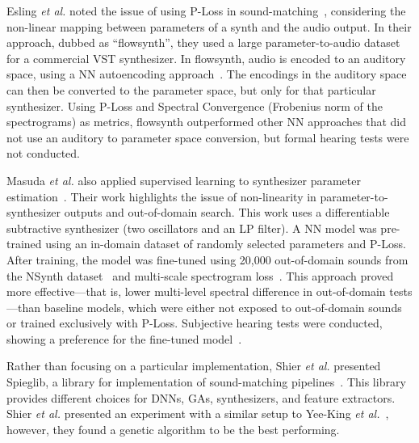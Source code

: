 \documentclass[lettersize,journal]{IEEEtran}
\providecommand{\gls}[1]{#1}
\begin{document}

Esling \textit{et al.} noted the issue of using P-Loss in sound-matching~\cite{esling2019flow}, considering the non-linear mapping between parameters of a synth and the audio output. In their approach, dubbed as ``flowsynth'', they used a large parameter-to-audio dataset for a commercial \gls{VST} synthesizer. In flowsynth, audio is encoded to an auditory space, using a NN autoencoding approach~\cite{hinton2006reducing}. The encodings in the auditory space can then be converted to the parameter space, but only for that particular synthesizer. Using P-Loss and Spectral Convergence (Frobenius norm of the spectrograms) as metrics, flowsynth outperformed other NN approaches that did not use an auditory to parameter space conversion, but formal hearing tests were not conducted.

Masuda \textit{et al.} also applied supervised learning to synthesizer parameter estimation~\cite{masuda2021soundmatch}. Their work highlights the issue of non-linearity in parameter-to-synthesizer outputs and out-of-domain search. This work uses a differentiable subtractive synthesizer (two oscillators and an LP filter). A NN model was pre-trained using an in-domain dataset of randomly selected parameters and P-Loss. After training, the model was fine-tuned using 20,000 out-of-domain sounds from the NSynth dataset~\cite{engel2017neural} and multi-scale spectrogram loss~\cite{engel2020ddsp}. This approach proved more effective---that is, lower multi-level spectral difference in out-of-domain tests---than baseline models, which were either not exposed to out-of-domain sounds or trained exclusively with P-Loss. Subjective hearing tests were conducted, showing a preference for the fine-tuned model~\cite{masuda2021soundmatch}. 


Rather than focusing on a particular implementation, Shier \textit{et al.} presented Spieglib, a library for implementation of sound-matching pipelines~\cite{shier2020spiegelib}. This library provides different choices for DNNs, GAs, synthesizers, and feature extractors. Shier \textit{et al.} presented an experiment with a similar setup to Yee-King \textit{et al.}~\cite{yee2018automatic}, however, they found a genetic algorithm to be the best performing.
\end{document}
